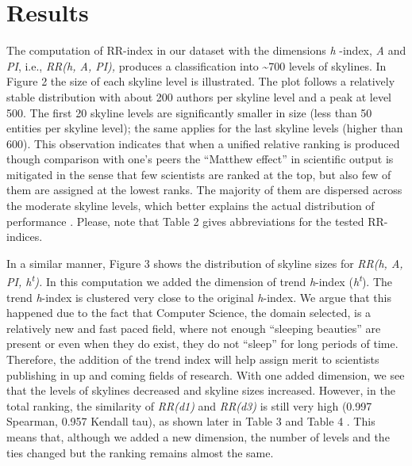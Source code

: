 \section{Results}\label{results}

The computation of RR-index in our dataset with the dimensions
\emph{h} -index, \emph{A} and \emph{PI}, i.e., \emph{RR(h, A, PI),}
produces a classification into \textasciitilde{}700 levels of skylines.
In Figure 2 the size of each skyline level is illustrated. The plot
follows a relatively stable distribution with about 200 authors per
skyline level and a peak at level 500. The first 20 skyline levels are
signifi­cantly smaller in size (less than 50 entities per skyline
level); the same applies for the last sky­line levels (higher than 600).
This observation indicates that when a unified relative ranking is
produced though comparison with one's peers the ``Matthew effect'' in
scientific output is mi­tigated in the sense that few scientists are
ranked at the top, but also few of them are assigned at the lowest
ranks. The majority of them are dispersed across the moderate skyline
levels, which better explains the actual distribution of performance .
Please, note that Table 2 gives abbreviations for the tested RR-indices.

In a similar manner, Figure 3 shows the distribution of skyline sizes
for \emph{RR(h, A, PI, h\textsuperscript{t}).} In this computation we
added the dimension of trend \emph{h}-index
(\emph{h\textsuperscript{t}}). The trend \emph{h}-index is clustered
very close to the original \emph{h}-index. We argue that this happened
due to the fact that Computer Science, the domain selected, is a
relatively new and fast paced field, where not enough ``slee­ping
beauties'' are present or even when they do exist, they do not ``sleep''
for long periods of time. Therefore, the addi­tion of the trend index
will help assign merit to scientists publishing in up and coming fields
of research. With one added dimension, we see that the levels of
skylines decreased and sky­line sizes increased. However, in the total
ranking, the similarity of \emph{RR(d1)} and \emph{RR(d3)} is still very
high (0.997 Spearman, 0.957 Kendall tau), as shown later in Table 3 and
Table 4 . This means that, although we added a new dimension, the number
of levels and the ties changed but the ranking remains almost the same.